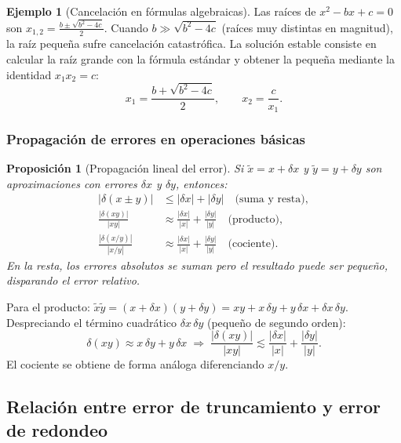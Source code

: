 \documentclass[a4paper,12pt]{article}
\theoremstyle{definition}
\newtheorem{ejemplo}{Ejemplo}[section]
\theoremstyle{plain}
\newtheorem{proposicion}{Proposición}[section]
\begin{document}
\begin{ejemplo}[Cancelación en fórmulas algebraicas]
Las raíces de $x^2 - bx + c = 0$ son
$x_{1,2} = \frac{b \pm \sqrt{b^2 - 4c}}{2}$.
Cuando $b \gg \sqrt{b^2 - 4c}$ (raíces muy distintas en magnitud), la raíz
pequeña sufre cancelación catastrófica. La solución estable consiste en
calcular la raíz grande con la fórmula estándar y obtener la pequeña mediante
la identidad $x_1 x_2 = c$:
\[
    x_1 = \frac{b + \sqrt{b^2 - 4c}}{2},
    \qquad
    x_2 = \frac{c}{x_1}.
\]
\end{ejemplo}

\subsubsection{Propagación de errores en operaciones básicas}

\begin{proposicion}[Propagación lineal del error]
Si $\tilde{x} = x + \delta x$ y $\tilde{y} = y + \delta y$ son aproximaciones
con errores $\delta x$ y $\delta y$, entonces:
\begin{align*}
    |\delta(x \pm y)| &\leq |\delta x| + |\delta y|
        \quad \text{(suma y resta)}, \\
    \frac{|\delta(xy)|}{|xy|} &\approx \frac{|\delta x|}{|x|}
        + \frac{|\delta y|}{|y|}
        \quad \text{(producto)}, \\
    \frac{|\delta(x/y)|}{|x/y|} &\approx \frac{|\delta x|}{|x|}
        + \frac{|\delta y|}{|y|}
        \quad \text{(cociente)}.
\end{align*}
En la resta, los errores absolutos se suman pero el resultado puede ser
pequeño, disparando el error relativo.
\end{proposicion}

\begin{demostracion}
Para el producto: $\tilde{x}\tilde{y} = (x+\delta x)(y+\delta y) = xy
+ x\,\delta y + y\,\delta x + \delta x\,\delta y$. Despreciando el término
cuadrático $\delta x\,\delta y$ (pequeño de segundo orden):
\[
    \delta(xy) \approx x\,\delta y + y\,\delta x
    \;\Rightarrow\;
    \frac{|\delta(xy)|}{|xy|} \lesssim \frac{|\delta x|}{|x|}
    + \frac{|\delta y|}{|y|}.
\]
El cociente se obtiene de forma análoga diferenciando $x/y$.
\end{demostracion}

\subsection{Relación entre error de truncamiento y error de redondeo}
\end{document}
